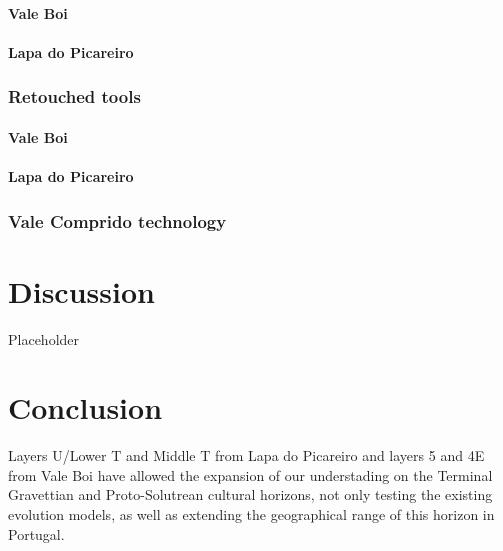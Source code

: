 \documentclass[12pt,twoside]{reedthesis}
\begin{document}
\hypertarget{vale-boi-6}{%
\subsubsection{Vale Boi}\label{vale-boi-6}}

\hypertarget{lapa-do-picareiro-6}{%
\subsubsection{Lapa do Picareiro}\label{lapa-do-picareiro-6}}

\hypertarget{retouched-tools}{%
\subsection{Retouched tools}\label{retouched-tools}}

\hypertarget{vale-boi-7}{%
\subsubsection{Vale Boi}\label{vale-boi-7}}

\hypertarget{lapa-do-picareiro-7}{%
\subsubsection{Lapa do Picareiro}\label{lapa-do-picareiro-7}}

\hypertarget{vale-comprido-technology}{%
\subsection{Vale Comprido technology}\label{vale-comprido-technology}}

\hypertarget{discussion}{%
\chapter{Discussion}\label{discussion}}

Placeholder

\hypertarget{conclusion}{%
\chapter*{Conclusion}\label{conclusion}}

Layers U/Lower T and Middle T from Lapa do Picareiro and layers 5 and 4E from Vale Boi have allowed the expansion of our understading on the Terminal Gravettian and Proto-Solutrean cultural horizons, not only testing the existing evolution models, as well as extending the geographical range of this horizon in Portugal.
\end{document}
